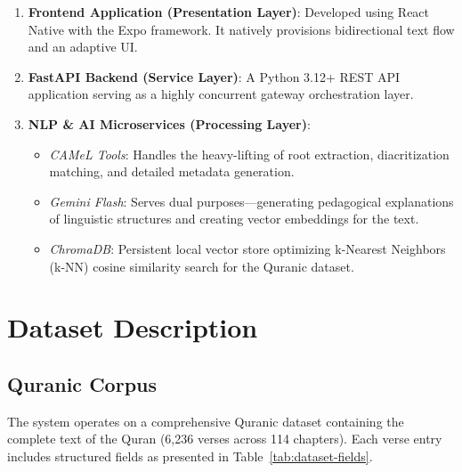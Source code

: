 \documentclass[11pt, a4paper]{article}
\begin{document}
\begin{enumerate}
    \item \textbf{Frontend Application (Presentation Layer)}: Developed using React Native with the Expo framework. It natively provisions bidirectional text flow and an adaptive UI.
    \item \textbf{FastAPI Backend (Service Layer)}: A Python 3.12+ REST API application serving as a highly concurrent gateway orchestration layer.
    \item \textbf{NLP \& AI Microservices (Processing Layer)}:
    \begin{itemize}
        \item \textit{CAMeL Tools}: Handles the heavy-lifting of root extraction, diacritization matching, and detailed metadata generation.
        \item \textit{Gemini Flash}: Serves dual purposes---generating pedagogical explanations of linguistic structures and creating vector embeddings for the text.
        \item \textit{ChromaDB}: Persistent local vector store optimizing k-Nearest Neighbors (k-NN) cosine similarity search for the Quranic dataset.
    \end{itemize}
\end{enumerate}

\section{Dataset Description}

\subsection{Quranic Corpus}
The system operates on a comprehensive Quranic dataset containing the complete text of the Quran (6,236 verses across 114 chapters). Each verse entry includes structured fields as presented in Table~\ref{tab:dataset-fields}.
\end{document}
